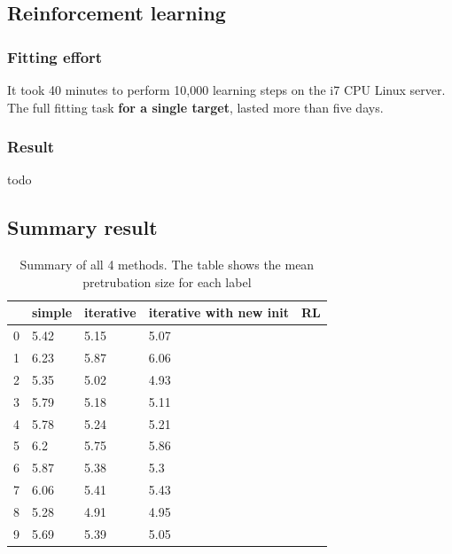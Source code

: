 \documentclass{article}
\begin{document}
\subsection{Reinforcement learning}

\subsubsection{Fitting effort}
It took 40 minutes to perform 10,000 learning steps on the i7 CPU Linux server.
The full fitting task \textbf{for a single target}, lasted more than five days.

\subsubsection{Result}
todo



\subsection{Summary result}

\begin{table}[h]
\caption{Summary of all 4 methods. The table shows the mean pretrubation size for each label}
\label{tab:summary}
\begin{tabular}{|l|l|l|l|l|}
\hline
  & simple & iterative & iterative with new init & RL \\ \hline
0 & 5.42   & 5.15      & 5.07                    &    \\ \hline
1 & 6.23   & 5.87      & 6.06                    &    \\ \hline
2 & 5.35   & 5.02      & 4.93                    &    \\ \hline
3 & 5.79   & 5.18      & 5.11                    &    \\ \hline
4 & 5.78   & 5.24      & 5.21                    &    \\ \hline
5 & 6.2    & 5.75      & 5.86                    &    \\ \hline
6 & 5.87   & 5.38      & 5.3                     &    \\ \hline
7 & 6.06   & 5.41      & 5.43                    &    \\ \hline
8 & 5.28   & 4.91      & 4.95                    &    \\ \hline
9 & 5.69   & 5.39      & 5.05                    &    \\ \hline
\end{tabular}
\end{table}
\end{document}
